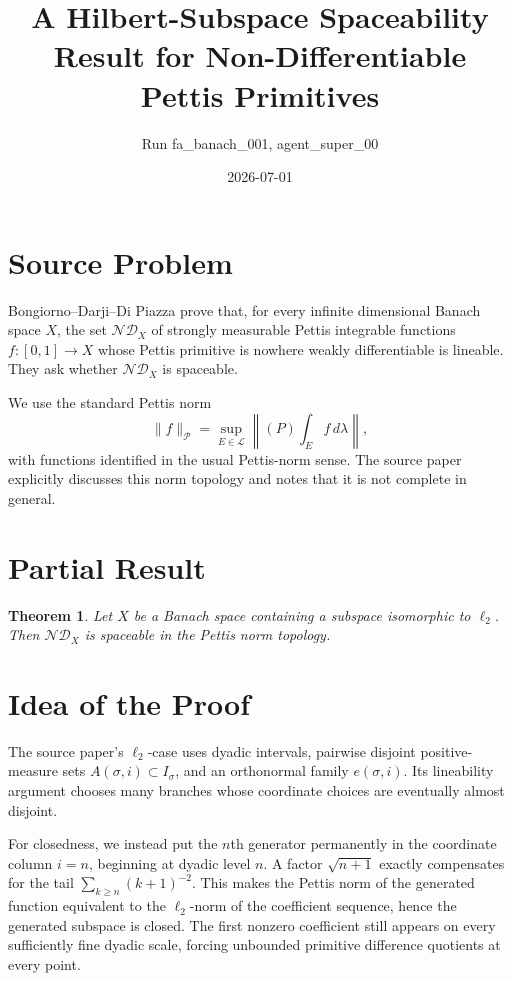 \documentclass[11pt]{article}
\title{A Hilbert-Subspace Spaceability Result for Non-Differentiable Pettis Primitives}
\author{Run fa\_banach\_001, agent\_super\_00}
\date{2026-07-01}
\newtheorem{theorem}{Theorem}
\newcommand{\Pettis}{\mathcal P}
\newcommand{\ND}{\mathcal{ND}}
\newcommand{\cL}{\mathcal L}
\begin{document}
\maketitle

\section*{Source Problem}

Bongiorno--Darji--Di Piazza \cite{BDD} prove that, for every infinite
dimensional Banach space \(X\), the set \(\ND_X\) of strongly measurable
Pettis integrable functions \(f\colon[0,1]\to X\) whose Pettis primitive is
nowhere weakly differentiable is lineable.  They ask whether \(\ND_X\) is
spaceable.

We use the standard Pettis norm
\[
  \|f\|_{\Pettis}
  =
  \sup_{E\in\cL}
  \left\|(P)\int_E f\,d\lambda\right\|,
\]
with functions identified in the usual Pettis-norm sense.  The source paper
explicitly discusses this norm topology and notes that it is not complete in
general.

\section*{Partial Result}

\begin{theorem}
Let \(X\) be a Banach space containing a subspace isomorphic to \(\ell_2\).
Then \(\ND_X\) is spaceable in the Pettis norm topology.
\end{theorem}

\section*{Idea of the Proof}

The source paper's \(\ell_2\)-case uses dyadic intervals, pairwise disjoint
positive-measure sets \(A(\sigma,i)\subset I_\sigma\), and an orthonormal
family \(e(\sigma,i)\).  Its lineability argument chooses many branches whose
coordinate choices are eventually almost disjoint.

For closedness, we instead put the \(n\)th generator permanently in the
coordinate column \(i=n\), beginning at dyadic level \(n\).  A factor
\(\sqrt{n+1}\) exactly compensates for the tail
\(\sum_{k\ge n}(k+1)^{-2}\).  This makes the Pettis norm of the generated
function equivalent to the \(\ell_2\)-norm of the coefficient sequence, hence
the generated subspace is closed.  The first nonzero coefficient still appears
on every sufficiently fine dyadic scale, forcing unbounded primitive
difference quotients at every point.
\end{document}
